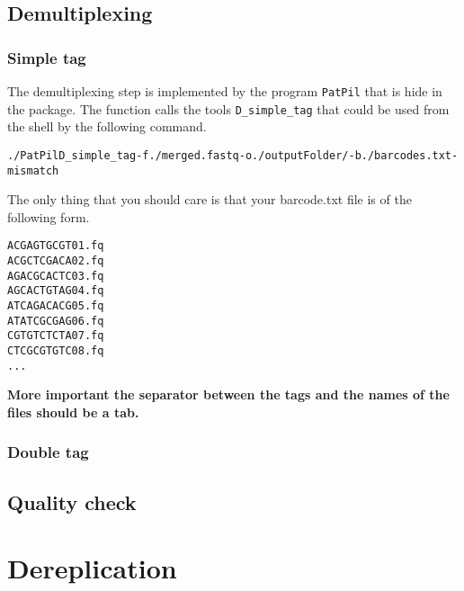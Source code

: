 \documentclass{article}\usepackage[]{graphicx}\usepackage[]{color}
\makeatletter
\newenvironment{kframe}{%
 \def\at@end@of@kframe{}%
 \ifinner\ifhmode%
  \def\at@end@of@kframe{\end{minipage}}%
  \begin{minipage}{\columnwidth}%
 \fi\fi%
 \def\FrameCommand##1{\hskip\@totalleftmargin \hskip-\fboxsep
 \colorbox{shadecolor}{##1}\hskip-\fboxsep
     \hskip-\linewidth \hskip-\@totalleftmargin \hskip\columnwidth}%
 \MakeFramed {\advance\hsize-\width
   \@totalleftmargin\z@ \linewidth\hsize
   \@setminipage}}%
 {\par\unskip\endMakeFramed%
 \at@end@of@kframe}
\newenvironment{knitrout}{}{} %
\makeatother
\begin{document}
\subsection{Demultiplexing}
\label{subsec:demux}


\subsubsection{Simple tag}
The demultiplexing step is implemented by the program \texttt{PatPil} that is hide in the package. The function calls the tools \texttt{D\_simple\_tag} that could be used from the shell by the following command.

\begin{knitrout}\footnotesize
{}\color{fgcolor}\begin{kframe}
\begin{alltt}
./PatPil D_simple_tag -f ./merged.fastq -o ./outputFolder/ -b ./barcodes.txt -mismatch
\end{alltt}
\end{kframe}
\end{knitrout}

The only thing that you should care is that your barcode.txt file is of the following form.

\begin{knitrout}
\color{fgcolor}\begin{kframe}
\begin{alltt}
ACGAGTGCGT	01.fq
ACGCTCGACA	02.fq
AGACGCACTC	03.fq
AGCACTGTAG	04.fq
ATCAGACACG	05.fq
ATATCGCGAG	06.fq
CGTGTCTCTA	07.fq
CTCGCGTGTC	08.fq
...
\end{alltt}
\end{kframe}
\end{knitrout}

\textbf{More important the separator between the tags and the names of the files should be a tab.}

\subsubsection{Double tag}


\subsection{Quality check}
\label{subsec:qualcheck}

\cite{Edgar2015}



\section{Dereplication}






\end{document}
